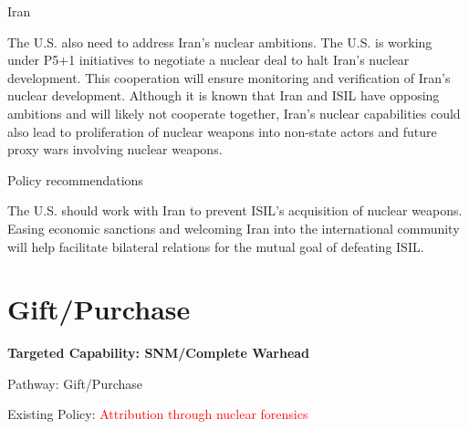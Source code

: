 \documentclass{report}
\begin{document}
Iran

The U.S. also need to address Iran's nuclear ambitions.  The U.S. is working under P5+1 initiatives to negotiate a nuclear deal to halt Iran's nuclear development. This cooperation will ensure monitoring and verification of Iran's nuclear development. Although it is known that Iran and ISIL have opposing ambitions and will likely not cooperate together, Iran's nuclear capabilities could also lead to proliferation of nuclear weapons into non-state actors and future proxy wars involving nuclear weapons.

Policy recommendations

The U.S. should work with Iran to prevent ISIL's acquisition of nuclear weapons. Easing economic sanctions and welcoming Iran into the international community will help facilitate bilateral relations for the mutual goal of defeating ISIL.  
 











\section{Gift/Purchase} \label{sec:purchase_gift}



\bfseries Targeted Capability: SNM/Complete Warhead

Pathway: Gift/Purchase

Existing Policy: \textcolor{red}{Attribution through nuclear forensics}
\end{document}
